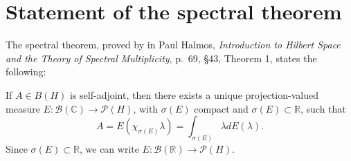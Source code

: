 \documentclass{article}
\begin{document}
\section{Statement of the spectral theorem}
The spectral theorem, proved by in Paul Halmos, {\em Introduction to Hilbert Space and the Theory of Spectral Multiplicity}, p.~69, \S 43, Theorem 1,
states the following:

If $A \in B(H)$ is self-adjoint, then there exists a unique projection-valued measure $E:\mathscr{B}(\mathbb{C}) \to \mathscr{P}(H)$, with $\sigma(E)$ compact and $\sigma(E) \subset \mathbb{R}$, such that
\[
A=E(\chi_{\sigma(E)} \lambda)=\int_{\sigma(E)} \lambda dE(\lambda).
\]
Since $\sigma(E) \subset \mathbb{R}$, we can write $E:\mathscr{B}(\mathbb{R}) \to \mathscr{P}(H)$. 
\end{document}
